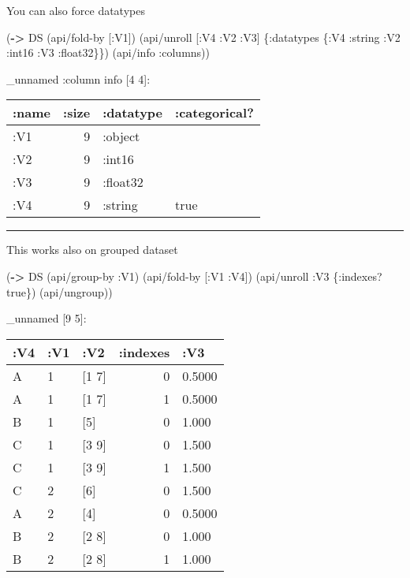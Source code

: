\documentclass[]{article}
\newenvironment{Shaded}{\begin{snugshade}}{\end{snugshade}}
\newcommand{\KeywordTok}[1]{\textcolor[rgb]{0.13,0.29,0.53}{\textbf{#1}}}
\newcommand{\VariableTok}[1]{\textcolor[rgb]{0.00,0.00,0.00}{#1}}
\newcommand{\AttributeTok}[1]{\textcolor[rgb]{0.77,0.63,0.00}{#1}}
\newcommand{\NormalTok}[1]{#1}
\begin{document}
You can also force datatypes

\begin{Shaded}
\begin{Highlighting}[]
\NormalTok{(}\KeywordTok{->}\NormalTok{ DS}
\NormalTok{    (api/fold-by [}\AttributeTok{:V1}\NormalTok{])}
\NormalTok{    (api/unroll [}\AttributeTok{:V4} \AttributeTok{:V2} \AttributeTok{:V3}\NormalTok{] \{}\AttributeTok{:datatypes}\NormalTok{ \{}\AttributeTok{:V4} \AttributeTok{:string}
                                           \AttributeTok{:V2} \AttributeTok{:int16}
                                           \AttributeTok{:V3} \AttributeTok{:float32}\NormalTok{\}\})}
\NormalTok{    (api/info }\AttributeTok{:columns}\NormalTok{))}
\end{Highlighting}
\end{Shaded}

\_unnamed :column info {[}4 4{]}:

\begin{longtable}[]{@{}lrll@{}}
\toprule
:name & :size & :datatype & :categorical?\tabularnewline
\midrule
\endhead
:V1 & 9 & :object &\tabularnewline
:V2 & 9 & :int16 &\tabularnewline
:V3 & 9 & :float32 &\tabularnewline
:V4 & 9 & :string & true\tabularnewline
\bottomrule
\end{longtable}

\begin{center}\rule{0.5\linewidth}{0.5pt}\end{center}

This works also on grouped dataset

\begin{Shaded}
\begin{Highlighting}[]
\NormalTok{(}\KeywordTok{->}\NormalTok{ DS}
\NormalTok{    (api/group-by }\AttributeTok{:V1}\NormalTok{)}
\NormalTok{    (api/fold-by [}\AttributeTok{:V1} \AttributeTok{:V4}\NormalTok{])}
\NormalTok{    (api/unroll }\AttributeTok{:V3}\NormalTok{ \{}\AttributeTok{:indexes}\NormalTok{? }\VariableTok{true}\NormalTok{\})}
\NormalTok{    (api/ungroup))}
\end{Highlighting}
\end{Shaded}

\_unnamed {[}9 5{]}:

\begin{longtable}[]{@{}lllrl@{}}
\toprule
:V4 & :V1 & :V2 & :indexes & :V3\tabularnewline
\midrule
\endhead
A & 1 & {[}1 7{]} & 0 & 0.5000\tabularnewline
A & 1 & {[}1 7{]} & 1 & 0.5000\tabularnewline
B & 1 & {[}5{]} & 0 & 1.000\tabularnewline
C & 1 & {[}3 9{]} & 0 & 1.500\tabularnewline
C & 1 & {[}3 9{]} & 1 & 1.500\tabularnewline
C & 2 & {[}6{]} & 0 & 1.500\tabularnewline
A & 2 & {[}4{]} & 0 & 0.5000\tabularnewline
B & 2 & {[}2 8{]} & 0 & 1.000\tabularnewline
B & 2 & {[}2 8{]} & 1 & 1.000\tabularnewline
\bottomrule
\end{longtable}
\end{document}
